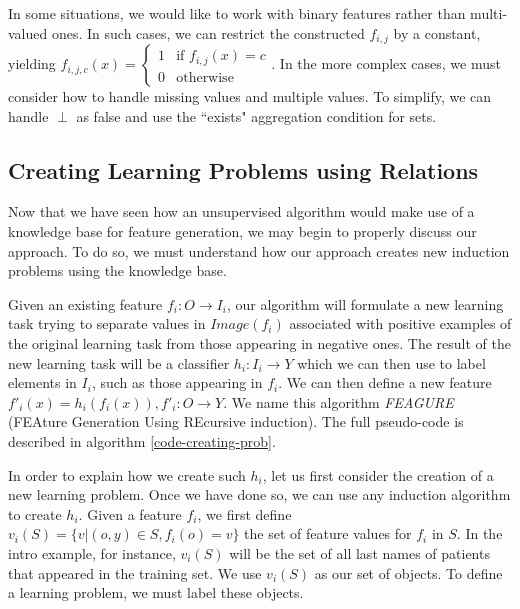 \documentclass[twoside,11pt]{article}
\theoremstyle{definition}
\begin{document}
In some situations, we would like to work with binary features rather than multi-valued ones. In such cases, we can restrict the constructed $f_{i,j}$ by a constant, yielding $f_{i,j,c}(x)=\begin{cases}
1 & \mbox{if } f_{i,j}(x)=c\\
0 & \mbox{otherwise}
\end{cases}$. In the more complex cases, we must consider how to handle missing values and multiple values. To simplify, we can handle $\perp$ as false and use the ``exists" aggregation condition for sets.

\subsection{Creating Learning Problems using Relations} \label{algorithm_section} 


Now that we have seen how an unsupervised algorithm would make use of a knowledge base for feature generation, we may begin to properly discuss our approach. To do so, we must understand how our approach creates new induction problems using the knowledge base.

Given an existing feature $f_{i}:O\rightarrow I_i$, our algorithm will formulate a new learning task trying to separate values in $Image(f_i)$ associated with positive examples of the original learning task from those appearing in negative ones. The result of the new learning task will be a classifier
$h_{i}:I_{i}\rightarrow Y$ which we can then use to label elements in $I_i$, such as those appearing in $f_{i}$. We can then define a new feature $f'_{i}(x)=h_{i}(f_{i}(x)), f'_{i}:O\rightarrow Y$.
We name this algorithm \emph{FEAGURE} (FEAture Generation Using REcursive induction). The full pseudo-code is described in algorithm \ref{code-creating-prob}.

In order to explain how we create such $h_{i}$, let us first consider the creation of a new learning problem. Once we have done so, we can use any induction algorithm to create $h_i$. 
Given a feature $f_{i}$, we first define $v_i(S) = \{v | (o,y) \in S, f_{i}(o)=v\}$ the set of feature values for $f_i$ in $S$. In the intro example, for instance, $v_i(S)$ will be the set of all last names of patients that appeared in the training set.
We use $v_i(S)$ as our set of objects. To define a learning problem, we must label these objects.
\end{document}
